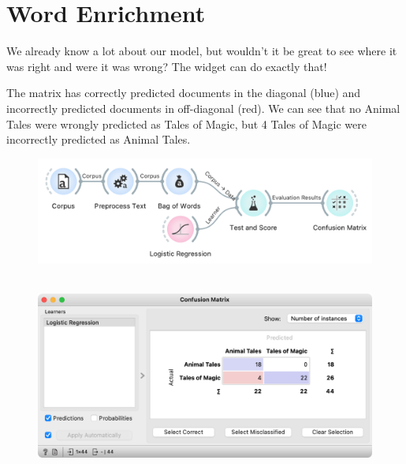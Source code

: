 \chapter{Word Enrichment}

We already know a lot about our model, but wouldn’t it be great to see where it was right and were it was wrong? The  widget can do exactly that!

The matrix has correctly predicted documents in the diagonal (blue) and incorrectly predicted documents in off-diagonal (red). We can see that no Animal Tales were wrongly predicted as Tales of Magic, but 4 Tales of Magic were incorrectly predicted as Animal Tales.

\vspace{-0.2cm}
\begin{figure}[h]
  \centering
  \includegraphics[width=0.8\linewidth]{workflow.png}%
  \caption{$\;$}
\end{figure}
\vspace{-0.3cm}

\vspace{-0.2cm}
\begin{figure}[h]
  \centering
  \includegraphics[width=0.8\linewidth]{confusion-matrix.png}%
  \caption{$\;$}
\end{figure}
\vspace{-0.3cm}

